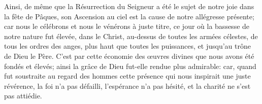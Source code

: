 Ainsi, de même que la Résurrection du Seigneur
		a été le sujet de notre joie dans la fête de Pâques,
	son Ascension au ciel est la cause de notre allégresse présente;
	car nous le célébrons et nous le vénérons à juste titre,
	ce jour où la bassesse de notre nature fut élevée, dans le Christ,
	au-dessus de toutes les armées célestes, de tous les ordres des anges,
	plus haut que toutes les puissances, et jusqu’au trône de Dieu le Père.
C’est par cette économie des œuvres divines
	que nous avons été fondés et élevés;
	ainsi la grâce de Dieu fut-elle rendue plus admirable:
	car, quand fut soustraite au regard des hommes
		cette présence qui nous inspirait une juste révérence,
	la foi n’a pas défailli,
	l’espérance n’a pas hésité,
	et la charité ne s’est pas attiédie.
